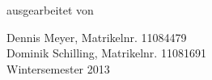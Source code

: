 \begin{titlepage}
\begin{center}
\vspace{1.6cm}

\begin{large}
	ausgearbeitet von\\
	\vspace{0.2cm}
\end{large}

\begin{Large}
	Dennis Meyer, Matrikelnr. 11084479\\
	Dominik Schilling, Matrikelnr. 11081691\\
	\vspace{1cm}
	Wintersemester 2013
\end{Large}

\end{center}

\end{titlepage}
